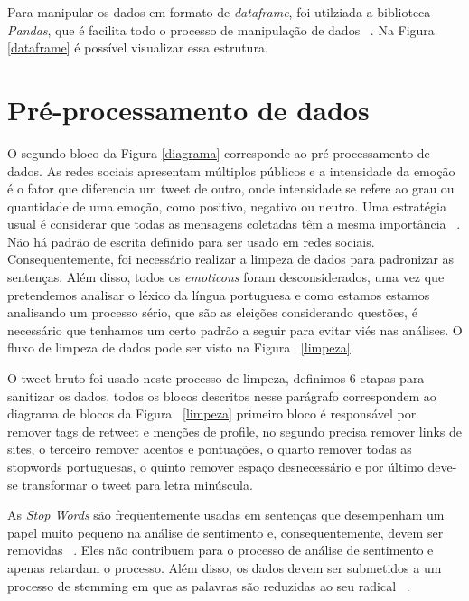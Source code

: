 Para manipular os dados em formato de \textit{dataframe}, foi utilziada a biblioteca \textit{Pandas},
que é facilita todo o processo de manipulação de dados ~\cite{mckinney2011pandas}. Na Figura \ref{dataframe} é possível visualizar essa estrutura.

%


\section{Pré-processamento de dados}
\label{sec:limpeza}

O segundo bloco da Figura \ref{diagrama} corresponde ao pré-processamento
de dados. As redes sociais apresentam múltiplos
públicos e a intensidade da emoção é o fator que diferencia um tweet de outro, onde intensidade se refere ao
grau ou quantidade de uma emoção, como positivo, negativo ou neutro.
Uma estratégia usual é considerar que todas as mensagens
coletadas têm a mesma importância ~\cite{de2015estrategia}.
Não há padrão de escrita definido para ser usado em redes
sociais. Consequentemente, foi necessário realizar a limpeza
de dados para padronizar as sentenças. Além disso, todos os
\textit{emoticons} foram desconsiderados, uma vez que pretendemos
analisar o léxico da língua portuguesa e como estamos estamos analisando um processo sério, que são as eleições
considerando questões, é necessário que tenhamos um certo padrão a seguir para evitar viés nas análises. O fluxo de limpeza de dados pode
ser visto na Figura ~\ref{limpeza}.




O tweet bruto foi usado neste processo de limpeza, definimos
6 etapas para sanitizar os dados, todos os blocos
descritos nesse parágrafo correspondem ao diagrama de blocos
da Figura ~\ref{limpeza} primeiro bloco é responsável por remover tags de
retweet e menções de profile, no segundo precisa remover links
de sites, o terceiro remover acentos e pontuações, o quarto
remover todas as stopwords portuguesas, o quinto remover
espaço desnecessário e por último deve-se transformar o tweet para letra minúscula.

As \textit{Stop Words} são freqüentemente usadas em sentenças
que desempenham um papel muito pequeno na análise de sentimento e, consequentemente, devem ser removidas ~\cite{sharma}.
Eles não contribuem para o processo de análise de sentimento
e apenas retardam o processo. Além disso, os dados devem ser
submetidos a um processo de stemming em que as palavras
são reduzidas ao seu radical ~\cite{de2015estrategia}.

